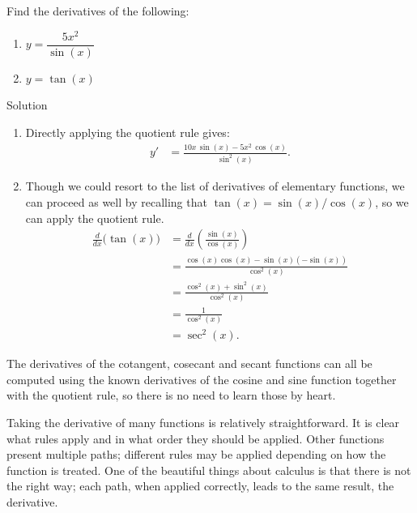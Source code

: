 \begin{example}
Find the derivatives of the following:
\begin{multicols}{2}
\begin{enumerate}
\item $y = \dfrac{5x^2}{\sin(x)}$
\item $y = \tan(x)$
\end{enumerate}
\end{multicols}

\ifanalysis\pagebreak\fi
{}Solution 

\begin{enumerate}
\item Directly applying the quotient rule gives:
	\begin{align*}
	y' &= \frac{10x\,\sin(x) - 5x^2\, \cos(x)}{\sin^2(x)}.
	\end{align*}
\item Though we could resort to the list of derivatives of elementary functions, we can proceed as well by recalling that $\tan (x) = \sin(x)/\cos(x)$, so we can apply the quotient rule.
\ifcalculus\allowdisplaybreaks\fi
		\begin{align*}
		\frac{d}{dx}\Big(\tan (x)\Big) &= \frac{d}{dx}\left(\frac{\sin (x)}{\cos (x)}\right) \\
																	&=	\frac{\cos (x) \cos (x) - \sin (x) (-\sin (x))}{\cos^2 (x)} \\[0.2cm]
																	&= \frac{\cos^2(x)+\sin^2(x)}{\cos^2(x)}\\[0.2cm]
																	&= \frac{1}{\cos^2(x)} \\[0.2cm]
																	&= \sec ^2 (x).
		\end{align*}
\end{enumerate}
\end{example}

The derivatives of the cotangent, cosecant and secant functions can all be computed  using the known derivatives of the cosine and sine function together with the quotient rule, so there is no need to learn those by heart.

Taking the derivative of many functions is relatively straightforward. It is clear  what rules apply and in what order they should be applied. Other functions present multiple paths; different rules may be applied depending on how the function is treated. One of the beautiful things about calculus is that there is not the right way; each path, when applied correctly, leads to the same result, the derivative.

